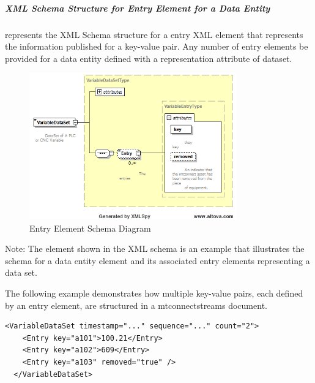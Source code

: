 

\subparagraph{XML Schema Structure for Entry Element for a Data Entity}\mbox{}
\label{sec:XML Schema Structure for Entry Element for a Data Entity}

 represents the XML Schema structure for a \gls{entry} XML element that represents the information published for a \gls{key-value pair}. Any number of \gls{entry} elements \MAY be provided for a \gls{data entity} defined with a \gls{representation} attribute of \gls{dataset}. 

\begin{figure}[ht]
  \centering
  \includegraphics[width=0.8\textwidth]{figures/entry-element-schema-diagram.png}
  \caption{Entry Element Schema Diagram}
  \label{fig:entry-element-schema-diagram}
\end{figure}
\FloatBarrier

\begin{note}
Note: The  element shown in the XML schema is an example that illustrates the schema for a \gls{data entity} element and its associated \gls{entry} elements representing a \gls{data set}.

\end{note}

The following example demonstrates how multiple \glspl{key-value pair}, each defined by an \gls{entry} element, are structured in a \gls{mtconnectstreams} document.
\begin{lstlisting}[firstnumber=1,escapechar=|,%
    caption={Example of multiple key-value pairs Reported for a Data Entity},label={lst:example-of-multiple-key-value-pairs-reported-for-a-data-entity}]
  <VariableDataSet timestamp="..." sequence="..." count="2">
    <Entry key="a101">100.21</Entry>
    <Entry key="a102">609</Entry>
    <Entry key="a103" removed="true" />
  </VariableDataSet>
\end{lstlisting}

